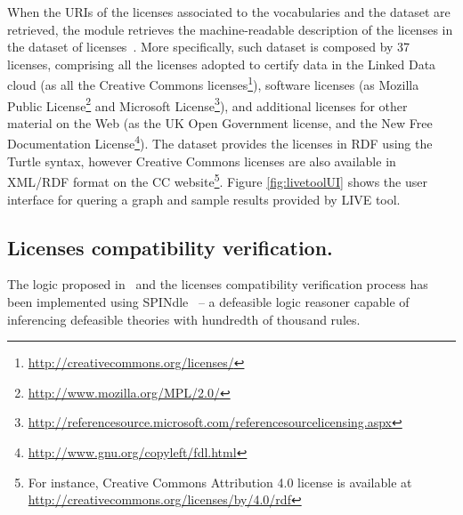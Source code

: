 When the URIs of the licenses associated to the vocabularies and the dataset are retrieved, the module retrieves the machine-readable description of the licenses in the dataset of licenses~\cite{CabrioESWC2014}. More specifically, such dataset is composed by 37 licenses, comprising all the licenses adopted to certify data in the Linked Data cloud (as all the Creative Commons licenses\footnote{\url{http://creativecommons.org/licenses/}}), software licenses (as Mozilla Public License\footnote{\url{http://www.mozilla.org/MPL/2.0/}} and Microsoft License\footnote{\url{http://referencesource.microsoft.com/referencesourcelicensing.aspx}}), and additional licenses for other material on the Web (as the UK Open Government license, and the New Free Documentation License\footnote{\url{http://www.gnu.org/copyleft/fdl.html}}). The dataset provides the licenses in RDF using the Turtle syntax, however Creative Commons licenses are also available in XML/RDF format on the CC website\footnote{For instance, Creative Commons Attribution 4.0 license is available at \url{http://creativecommons.org/licenses/by/4.0/rdf}}.
Figure \ref{fig:livetoolUI} shows the user interface for quering a graph and sample results provided by LIVE tool.  

\begin{figure}[ht!b]
\end{figure}

\subsection{Licenses compatibility verification.}
The logic proposed in~\cite{DBLP:conf/semweb/GovernatoriRVG13} 
and the licenses compatibility verification process has been implemented using SPINdle~\cite{spindle} 
-- a defeasible logic reasoner capable of inferencing defeasible theories with hundredth of thousand rules.

